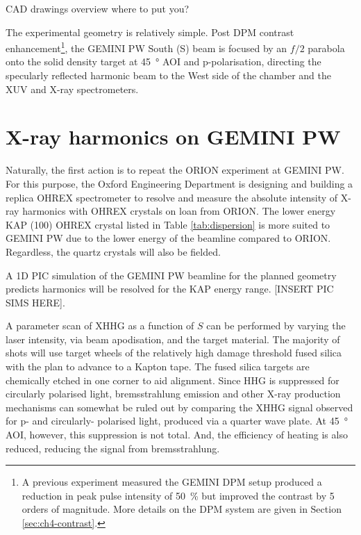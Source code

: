 

CAD drawings overview where to put you?

The experimental geometry is relatively simple. Post \ac{DPM} contrast enhancement\footnote{A previous experiment measured the GEMINI DPM setup produced a reduction in peak pulse intensity of \qty{50}{\%} but improved the contrast by 5 orders of magnitude. More details on the DPM system are given in Section \ref{sec:ch4-contrast}.}, the GEMINI PW South (S) beam is focused by an $f/2$ parabola onto the solid density target at \qty{45}{\degree} \ac{AOI} and p-polarisation, directing the specularly reflected harmonic beam to the West side of the chamber and the XUV and X-ray spectrometers.

\section{X-ray harmonics on GEMINI PW}\label{sec:ch4-xray}
Naturally, the first action is to repeat the ORION experiment at GEMINI PW. For this purpose, the Oxford Engineering Department is designing and building a replica OHREX spectrometer to resolve and measure the absolute intensity of X-ray harmonics with OHREX crystals on loan from ORION. The lower energy KAP (100) OHREX crystal listed in Table \ref{tab:dispersion} is more suited to GEMINI PW due to the lower energy of the beamline compared to ORION. Regardless, the quartz crystals will also be fielded. 

A 1D PIC simulation of the GEMINI PW beamline for the planned geometry predicts harmonics will be resolved for the KAP energy range.
[INSERT PIC SIMS HERE].

A parameter scan of \ac{XHHG} as a function of $S$ can be performed by varying the laser intensity, via beam apodisation, and the target material. The majority of shots will use target wheels of the relatively high damage threshold fused silica with the plan to advance to a Kapton tape. The fused silica targets are chemically etched in one corner to aid alignment.
Since HHG is suppressed for circularly polarised light, bremsstrahlung emission and other X-ray production mechanisms can somewhat be ruled out by comparing the \ac{XHHG} signal observed for p- and circularly- polarised light, produced via a quarter wave plate. At \qty{45}{\degree} \ac{AOI}, however, this suppression is not total. And, the efficiency of heating is also reduced, reducing the signal from bremsstrahlung.


